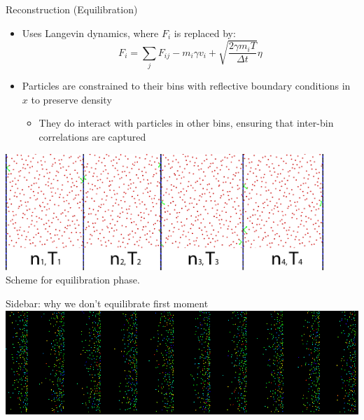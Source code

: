 \documentclass{beamer}
\begin{document}
	\begin{frame}{Reconstruction (Equilibration)}
		\begin{itemize}
			\item Uses Langevin dynamics, where $F_i$ is replaced by:
			\begin{equation*}
			F_i = \sum_{j}F_{ij} - m_i\gamma v_i + \sqrt{\frac{2\gamma m_iT}{\Delta t}}\eta
			\end{equation*}
			\item Particles are constrained to their bins with reflective boundary conditions in $x$ to preserve density
			\begin{itemize}
				\item They do interact with particles in other bins, ensuring that inter-bin correlations are captured
			\end{itemize}
		\end{itemize}
		\begin{center}
			\includegraphics[width=0.9\textwidth]{figures/equilibration.png}
			\\\tiny Scheme for equilibration phase.
		\end{center}
	\end{frame}
	
	\begin{frame}{Sidebar: why we don't equilibrate first moment}
		\includegraphics[width=1.0\textwidth]{figures/shitty_equilibration.png}
	\end{frame}
	
\end{document}
